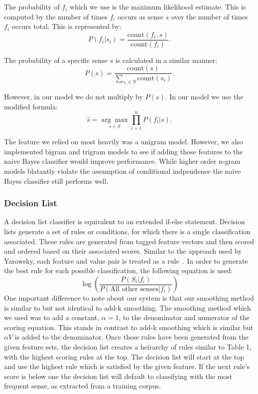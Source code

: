 \documentclass[11pt]{article}
\newcommand{\cou}{\textrm{count}}
\begin{document}
The probability of ${f_i}$ which we use is the maximum likelihood estimate. This is computed by the number of times $f_i$ occurs as sense $s$ over the number of times $f_i$ occurs total. 
This is represented by:
\[P(f_i|s_i) = \frac{\cou(f_i,s)}{\cou(f_i)}.\]

The probability of a specific sense $s$ is calculated in a similar manner:
$$P(s) = \frac{\cou(s)}{\underset{s_i \in S}{\sum} \cou(s_i)}.$$

However, in our model we do not multiply by $P(s)$. In our model we use the modified formula:
\[\hat{s} = \underset{s \in S}{\arg\max}{{\prod_{i=1}^n}P(f_i|s)}.\]

The feature we relied on most heavily was a unigram model. However, we also implemented bigram and trigram models to see if adding those features to the naive Bayes classifier would improve performance. While higher order n-gram models blatantly violate the assumption of conditional indpendence the naive Bayes classifier still performs well.

\subsubsection*{Decision List}
A decision list classifier is equivalent to an extended if-else statement. Decision lists generate a set of rules or conditions, for which there is a single classification associated. These rules are generated from tagged feature vectors and then scored and ordered based on their associated scores. Similar to the approach used by Yarowsky, each feature and value pair is treated as a rule~\cite{yarowsky1994decision}. In order to generate the best rule for each possible classification, the following equation is used:
\[ \log\left({\frac{P(S_i|f_i)}{P(\text{All other senses}|f_i)}}\right) \]
\indent One important difference to note about our system is that our smoothing method is similar to but not identical to add-k smoothing. The smoothing method which we used was to add a constant, $\alpha = 1$, to the denominator and numerator of the scoring equation. This stands in contrast to add-k smoothing which is similar but $\alpha V$ is added to the denominator. Once these rules have been generated from the given feature sets, the decision list creates a heirarchy of rules similar to Table 1, with the highest scoring rules at the top. The decision list will start at the top and use the highest rule which is satisfied by the given feature. If the next rule's score is below one the decision list will default to classifying with the most frequent sense, as extracted from a training corpus.
\end{document}
